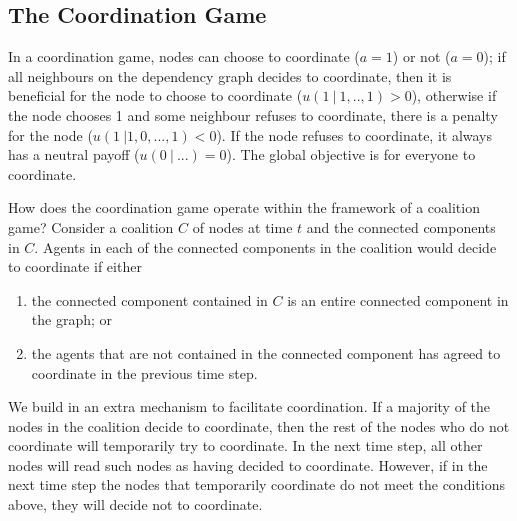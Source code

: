 \subsection{The Coordination Game}
In a coordination game, nodes can choose to coordinate ($a = 1$) or not ($a = 0$); if all neighbours on the dependency graph decides to coordinate, then it is beneficial for the node to choose to coordinate ($u(1\ \lvert\ 1,..,1) >0$), otherwise if the node chooses 1 and some neighbour refuses to coordinate, there is a penalty for the node ($u(1 \ \lvert 1, 0, ..., 1)<0$). If the node refuses to coordinate, it always has a neutral payoff ($u(0 \ \lvert \ ...) =0$).
The global objective is for everyone to coordinate.

How does the coordination game operate within the framework of a coalition game? Consider a coalition $C$ of nodes at time $t$ and the connected components in $C$. Agents in each of the connected components in the coalition would decide to coordinate if either
\begin{enumerate}
\item the connected component contained in $C$ is an entire connected component in the graph; or
\item the agents that are not contained in the connected component  has agreed to coordinate in the previous time step.
\end{enumerate}

We build in an extra mechanism to facilitate coordination. If a majority of the nodes in the coalition decide to coordinate, then the rest of the nodes who do not coordinate will temporarily try to coordinate. In the next time step, all other nodes will read such nodes as having decided to coordinate. However, if in the next time step the nodes that temporarily coordinate do not meet the conditions above, they will decide not to coordinate.
